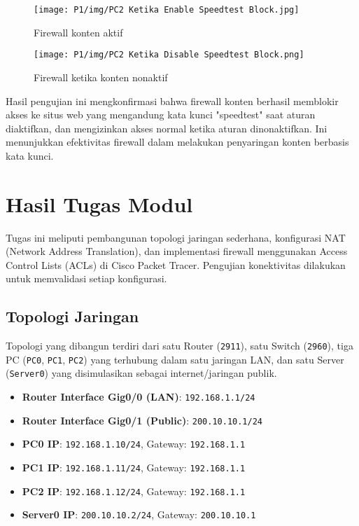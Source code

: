 \begin{figure}[H]
    \centering
    \begin{minipage}[t]{0.48\textwidth}
        \centering  
        \texttt{[image: P1/img/PC2 Ketika Enable Speedtest Block.jpg]}
        \caption{Firewall konten aktif}
        \label{fig:ping_acl2_pc0}
    \end{minipage}
    \hfill
    \begin{minipage}[t]{0.48\textwidth}
        \centering
        \texttt{[image: P1/img/PC2 Ketika Disable Speedtest Block.png]}
        \caption{Firewall ketika konten nonaktif}
        \label{fig:ping_acl2_pc1}
    \end{minipage}
\end{figure}

Hasil pengujian ini mengkonfirmasi bahwa firewall konten berhasil memblokir akses ke situs web yang mengandung kata kunci "speedtest" saat aturan diaktifkan, dan mengizinkan akses normal ketika aturan dinonaktifkan. Ini menunjukkan efektivitas firewall dalam melakukan penyaringan konten berbasis kata kunci.

\section{Hasil Tugas Modul}

Tugas ini meliputi pembangunan topologi jaringan sederhana, konfigurasi NAT (Network Address Translation), dan implementasi firewall menggunakan Access Control Lists (ACLs) di Cisco Packet Tracer. Pengujian konektivitas dilakukan untuk memvalidasi setiap konfigurasi.

\subsection*{Topologi Jaringan}
Topologi yang dibangun terdiri dari satu Router (\texttt{2911}), satu Switch (\texttt{2960}), tiga PC (\texttt{PC0}, \texttt{PC1}, \texttt{PC2}) yang terhubung dalam satu jaringan LAN, dan satu Server (\texttt{Server0}) yang disimulasikan sebagai internet/jaringan publik.

\begin{itemize}
    \item \textbf{Router Interface Gig0/0 (LAN)}: \texttt{192.168.1.1/24}
    \item \textbf{Router Interface Gig0/1 (Public)}: \texttt{200.10.10.1/24}
    \item \textbf{PC0 IP}: \texttt{192.168.1.10/24}, Gateway: \texttt{192.168.1.1}
    \item \textbf{PC1 IP}: \texttt{192.168.1.11/24}, Gateway: \texttt{192.168.1.1}
    \item \textbf{PC2 IP}: \texttt{192.168.1.12/24}, Gateway: \texttt{192.168.1.1}
    \item \textbf{Server0 IP}: \texttt{200.10.10.2/24}, Gateway: \texttt{200.10.10.1}
\end{itemize}

